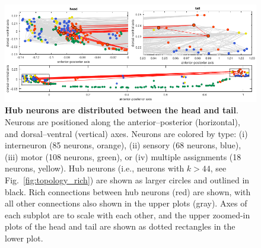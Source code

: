 \documentclass[10pt,letterpaper]{article}
\begin{document}

\begin{figure}[h]
\centering
    \includegraphics[width=1\textwidth]{SpatialPlot.png}
\caption{
\textbf{Hub neurons are distributed between the head and tail}.
Neurons are positioned along the anterior--posterior (horizontal), and dorsal--ventral (vertical) axes.
Neurons are colored by type:
(i) interneuron (85 neurons, orange),
(ii) sensory (68 neurons, blue),
(iii) motor (108 neurons, green), or
(iv) multiple assignments (18 neurons, yellow).
Hub neurons (i.e., neurons with $k > 44$, see Fig.~\ref{fig:topology_rich}) are shown as larger circles and outlined in black.
Rich connections between hub neurons (red) are shown, with all other connections also shown in the upper plots (gray).
Axes of each subplot are to scale with each other, and the upper zoomed-in plots of the head and tail are shown as dotted rectangles in the lower plot.
\label{fig:neuronsSpace}
}
\end{figure}
\end{document}
